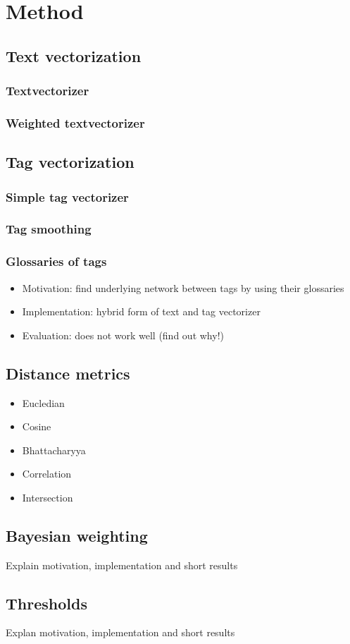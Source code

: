 \section{Method}

\subsection{Text vectorization}
\subsubsection{Textvectorizer}


\subsubsection{Weighted textvectorizer}


\subsection{Tag vectorization}
\subsubsection{Simple tag vectorizer}


\subsubsection{Tag smoothing}


\subsubsection{Glossaries of tags}
\begin{itemize}
\item Motivation: find underlying network between tags by using their glossaries
\item Implementation: hybrid form of text and tag vectorizer
\item Evaluation: does not work well (find out why!) 
\end{itemize}

\subsection{Distance metrics}
\begin{itemize}
\item Eucledian
\item Cosine
\item Bhattacharyya
\item Correlation
\item Intersection
\end{itemize}

\subsection{Bayesian weighting}
Explain motivation, implementation and short results

\subsection{Thresholds}
Explan motivation, implementation and short results